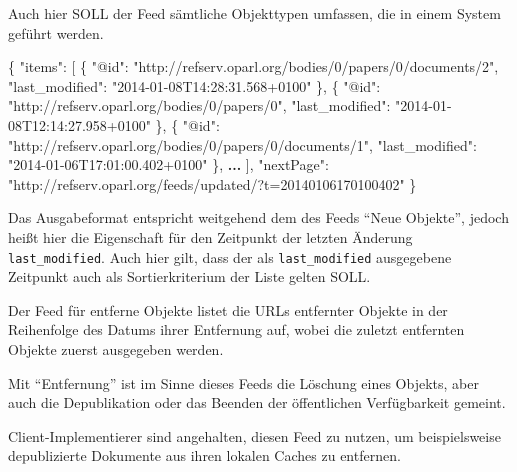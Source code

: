 \documentclass[,a4paper]{article}
\newenvironment{Shaded}{}{}
\newcommand{\DataTypeTok}[1]{\textcolor[rgb]{0.56,0.13,0.00}{{#1}}}
\newcommand{\StringTok}[1]{\textcolor[rgb]{0.25,0.44,0.63}{{#1}}}
\newcommand{\ErrorTok}[1]{\textcolor[rgb]{1.00,0.00,0.00}{\textbf{{#1}}}}
\newcommand{\NormalTok}[1]{{#1}}
\begin{document}
Auch hier SOLL der Feed sämtliche Objekttypen umfassen, die in einem
System geführt werden.

\begin{Shaded}
\begin{Highlighting}[]
\NormalTok{\{}
    \DataTypeTok{"items"}\NormalTok{: [}
        \NormalTok{\{}
            \DataTypeTok{"@id"}\NormalTok{: }\StringTok{"http://refserv.oparl.org/bodies/0/papers/0/documents/2"}\NormalTok{,}
            \DataTypeTok{"last_modified"}\NormalTok{: }\StringTok{"2014-01-08T14:28:31.568+0100"}
        \NormalTok{\},}
        \NormalTok{\{}
            \DataTypeTok{"@id"}\NormalTok{: }\StringTok{"http://refserv.oparl.org/bodies/0/papers/0"}\NormalTok{,}
            \DataTypeTok{"last_modified"}\NormalTok{: }\StringTok{"2014-01-08T12:14:27.958+0100"}
        \NormalTok{\},}
        \NormalTok{\{}
            \DataTypeTok{"@id"}\NormalTok{: }\StringTok{"http://refserv.oparl.org/bodies/0/papers/0/documents/1"}\NormalTok{,}
            \DataTypeTok{"last_modified"}\NormalTok{: }\StringTok{"2014-01-06T17:01:00.402+0100"}
        \NormalTok{\},}
        \ErrorTok{...}
    \NormalTok{],}
    \DataTypeTok{"nextPage"}\NormalTok{: }\StringTok{"http://refserv.oparl.org/feeds/updated/?t=20140106170100402"}
\NormalTok{\}}
\end{Highlighting}
\end{Shaded}

Das Ausgabeformat entspricht weitgehend dem des Feeds ``Neue Objekte'',
jedoch heißt hier die Eigenschaft für den Zeitpunkt der letzten Änderung
\texttt{last\_modified}. Auch hier gilt, dass der als
\texttt{last\_modified} ausgegebene Zeitpunkt auch als Sortierkriterium
der Liste gelten SOLL.


Der Feed für entferne Objekte listet die URLs entfernter Objekte in der
Reihenfolge des Datums ihrer Entfernung auf, wobei die zuletzt
entfernten Objekte zuerst ausgegeben werden.

Mit ``Entfernung'' ist im Sinne dieses Feeds die Löschung eines Objekts,
aber auch die Depublikation oder das Beenden der öffentlichen
Verfügbarkeit gemeint.

Client-Implementierer sind angehalten, diesen Feed zu nutzen, um
beispielsweise depublizierte Dokumente aus ihren lokalen Caches zu
entfernen.
\end{document}
